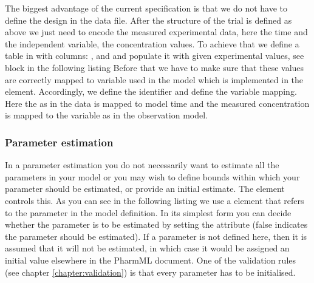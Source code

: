 The biggest advantage of the current specification is that we do not have
to define the design in the data file. After the structure of the trial is defined
as above we just need to encode the measured experimental data, here the time 
and the independent variable, the concentration values. To achieve that we 
define a table in  with columns: ,  and 
 and populate it with given experimental values, see  block 
in the following listing 
Before that we have to make sure that these values are correctly mapped to 
variable used in the model which is implemented in the 
element. Accordingly, we define the identifier  and 
define the variable mapping. Here the  as in the data is mapped 
to model time  and the measured concentration is mapped to the 
variable  as in the observation model.



\subsubsection{Parameter estimation}


In a parameter estimation you do not necessarily want to estimate all
the parameters in your model or you may wish to define bounds within
which your parameter should be estimated, or provide an initial
estimate.  The  element controls this. As
you can see in the following listing 
we use a  element that refers to the parameter in
the model definition.  In its simplest form you can decide whether the
parameter is to be estimated by setting the  attribute
(false indicates the parameter should be estimated). If a parameter is
not defined here, then it is assumed that it will not be estimated, in
which case it would be assigned an initial value elsewhere in the
PharmML document.  One of the validation rules (see chapter
\ref{chapter:validation}) is that every parameter has to be
initialised. 
 

%


